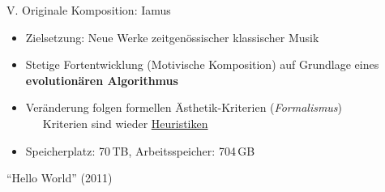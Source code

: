 \begin{frame}{V. \dimFiveTitle}{Originale Komposition: Iamus}
	
	\parbox{.8\textwidth}{
		\begin{itemize}
			\item Zielsetzung: Neue Werke zeitgenössischer klassischer Musik
			\item Stetige Fortentwicklung (Motivische Komposition) auf Grundlage eines \textbf{evolutionären Algorithmus}
			\item Veränderung folgen formellen Ästhetik-Kriterien (\emph{Formalismus})\\
			\smallskip
			~~\warnSign~Kriterien sind wieder \underline{Heuristiken}
			
			\medskip
			\item Speicherplatz: 70\,TB, Arbeitsspeicher: 704\,GB
		\end{itemize}
		
		\bigskip\bigskip
		\centering
		\enquote{Hello World} (2011) 
	}
\end{frame}


